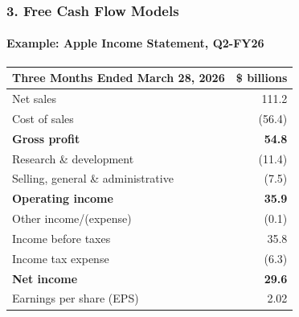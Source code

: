 \documentclass{beamer}
\begin{document}
\begin{frame}[t]
    \frametitle{3. Free Cash Flow Models}
    \framesubtitle{Example: Apple Income Statement, Q2-FY26}
    
    \begin{table}
        \centering
    \footnotesize
    \begin{tabular}{lr}
            \toprule
            \textbf{Three Months Ended March 28, 2026} & \textbf{\$ billions} \\
            \midrule
            Net sales & 111.2 \\
            Cost of sales & (56.4) \\
            \midrule
            \textbf{Gross profit} & \textbf{54.8} \\
            Research \& development & (11.4) \\
            Selling, general \& administrative & (7.5) \\
            \midrule
            \textbf{Operating income} & \textbf{35.9} \\
            Other income/(expense) & (0.1) \\
            \midrule
            Income before taxes & 35.8 \\
            Income tax expense & (6.3) \\
            \midrule
            \textbf{Net income} & \textbf{29.6} \\
            Earnings per share (EPS) & 2.02 \\
            \bottomrule
        \end{tabular}
    \end{table}

    \vspace{0.5em}

    
\end{frame}
\end{document}
